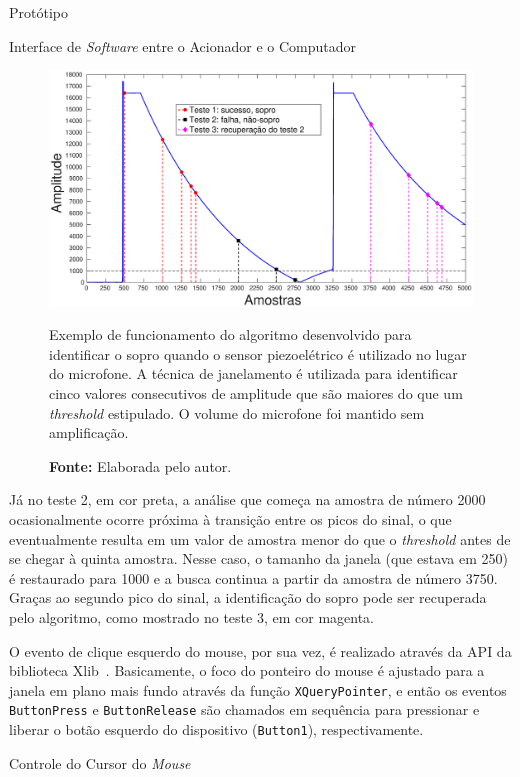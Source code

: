 \begin{chapter}{Protótipo}
\begin{section}{Interface de \textit{Software} entre o Acionador e o Computador}
\begin{figure}
	\centering
	\includegraphics[width=0.95\linewidth]{fig/pa_thresh}
	\caption{Exemplo de funcionamento do algoritmo desenvolvido para identificar
	o sopro quando o sensor piezoelétrico é utilizado no lugar do microfone. A
	técnica de janelamento é utilizada para identificar cinco valores
	consecutivos de amplitude que são maiores do que um \textit{threshold}
	estipulado. O volume do microfone foi mantido sem amplificação.}
	\vspace{-1cm}
	\caption*{\textbf{Fonte: }Elaborada pelo autor.}
	\label{fig:pa_thresh}

\vspace{-0.75cm}
\end{figure}

Já no teste 2, em cor preta, a análise que começa na amostra de número 2000
ocasionalmente ocorre próxima à transição entre os picos do sinal, o que
eventualmente resulta em um valor de amostra menor do que o \textit{threshold}
antes de se chegar à quinta amostra. Nesse caso, o tamanho da janela (que estava
em 250) é restaurado para 1000 e a busca continua a partir da amostra de número
3750.  Graças ao segundo pico do sinal, a identificação do sopro pode ser
recuperada pelo algoritmo, como mostrado no teste 3, em cor magenta. 
 
O evento de clique esquerdo do mouse, por sua vez, é realizado através da API da
biblioteca Xlib~\cite{xlib}. Basicamente, o foco do ponteiro do mouse é ajustado
para a janela em plano mais fundo através da função \texttt{XQueryPointer}, e
então os eventos \texttt{ButtonPress} e \texttt{ButtonRelease} são chamados em
sequência para pressionar e liberar o botão esquerdo do dispositivo
(\texttt{Button1}), respectivamente.
\end{section}

\begin{section}{Controle do Cursor do \textit{Mouse}}


\end{section}
\end{chapter}
